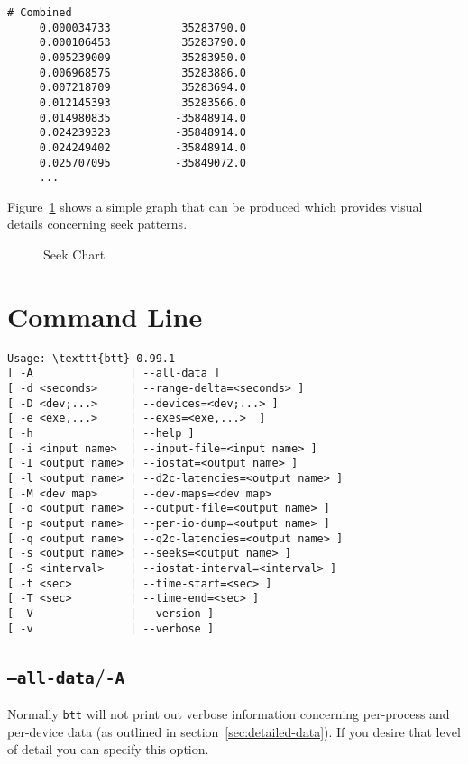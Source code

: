\documentclass{article}
\begin{document}
\begin{verbatim}
# Combined
     0.000034733           35283790.0
     0.000106453           35283790.0
     0.005239009           35283950.0
     0.006968575           35283886.0
     0.007218709           35283694.0
     0.012145393           35283566.0
     0.014980835          -35848914.0
     0.024239323          -35848914.0
     0.024249402          -35848914.0
     0.025707095          -35849072.0
     ...
\end{verbatim}

  Figure~\ref{fig:seek} shows a simple graph that can be produced which
  provides visual details concerning seek patterns.

  \begin{figure}[hb]
  \leavevmode\centering
  \caption{\label{fig:seek}Seek Chart}
  \end{figure}

\newpage\section{\label{sec:cmd-line}Command Line}

\begin{verbatim}
Usage: \texttt{btt} 0.99.1 
[ -A               | --all-data ]
[ -d <seconds>     | --range-delta=<seconds> ]
[ -D <dev;...>     | --devices=<dev;...> ]
[ -e <exe,...>     | --exes=<exe,...>  ]
[ -h               | --help ]
[ -i <input name>  | --input-file=<input name> ]
[ -I <output name> | --iostat=<output name> ]
[ -l <output name> | --d2c-latencies=<output name> ]
[ -M <dev map>     | --dev-maps=<dev map>
[ -o <output name> | --output-file=<output name> ]
[ -p <output name> | --per-io-dump=<output name> ]
[ -q <output name> | --q2c-latencies=<output name> ]
[ -s <output name> | --seeks=<output name> ]
[ -S <interval>    | --iostat-interval=<interval> ]
[ -t <sec>         | --time-start=<sec> ]
[ -T <sec>         | --time-end=<sec> ]
[ -V               | --version ]
[ -v               | --verbose ]
\end{verbatim}

\subsection{\label{sec:o-A}\texttt{--all-data}/\texttt{-A}}

  Normally \texttt{btt} will not print out verbose information
  concerning per-process and per-device data (as outlined in
  section~\ref{sec:detailed-data}). If you desire that level of 
  detail you can specify this option.
\end{document}
